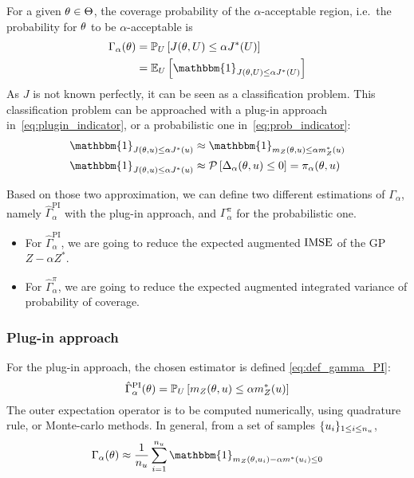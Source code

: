 \documentclass[../../Main_ManuscritThese.tex]{subfiles}
\begin{document}
For a given $\theta\in\Theta$, the coverage probability of the $\alpha$-acceptable region, i.e.\ the probability for $\theta$ to be $\alpha$-acceptable is
\begin{align}
  \Gamma_{\alpha}(\kk) &= \Prob_{U}\left[J(\kk,\UU) \leq \alpha J^*(\UU)\right] \\
                              & =\Ex_{U}\left[\mathbbm{1}_{J(\kk,\UU) \leq \alpha J^*(\UU)}\right]
\end{align}
As $J$ is not known perfectly, it can be seen as a classification problem.
This classification problem can be approached with a plug-in approach in~\cref{eq:plugin_indicator}, or a probabilistic one in~\cref{eq:prob_indicator}:
\begin{align}
  \mathbbm{1}_{J(\kk,\uu) \leq \alpha J^*(\uu)} &\approx   \mathbbm{1}_{m_Z(\kk,\uu) \leq \alpha m_Z^*(\uu)} \label{eq:plugin_indicator} \\
  \mathbbm{1}_{J(\kk,\uu) \leq \alpha J^*(\uu)} &\approx   \ProbGP\left[ \Delta_{\alpha}(\kk,\uu) \leq 0 \right] = \pi_{\alpha}(\kk,\uu) \label{eq:prob_indicator}
\end{align}

Based on those two approximation, we can define two different estimations of $\Gamma_\alpha$, namely $\hat{\Gamma}_\alpha^{\mathrm{PI}}$ with the plug-in approach, and $\Gamma_{\alpha}^{\pi}$ for the probabilistic one.
\begin{itemize}
\item For $\hat{\Gamma}_{\alpha}^{\mathrm{PI}}$, we are going to reduce the expected augmented $\operatorname{\mathrm{IMSE}}$ of the GP $Z - \alpha Z^*$.
\item For $\hat{\Gamma}_{\alpha}^{\pi}$, we are going to reduce the expected augmented integrated variance of probability of coverage.
\end{itemize}

\subsubsection{Plug-in approach}
For the plug-in approach, the chosen estimator is defined \cref{eq:def_gamma_PI}:
  \begin{equation}
    \label{eq:def_gamma_PI}
    \hat{\Gamma}_{\alpha}^{\mathrm{PI}}(\theta) = \mathbb{P}_U\left[m_Z(\theta,u) \leq \alpha m_Z^*(u) \right]
  \end{equation}
  The outer expectation operator is to be computed numerically, using quadrature rule, or Monte-carlo methods. In general, from a set of samples $\{u_i\}_{1\leq i \leq n_{u}}$,
  \begin{equation}
    \Gamma_{\alpha}(\kk) \approx \frac{1}{n_{\uu}}\sum_{i=1}^{n_{\uu}} \mathbbm{1}_{m_Z(\kk, \uu_i) - \alpha m^*(\uu_i)\leq 0}
  \end{equation}
\end{document}
